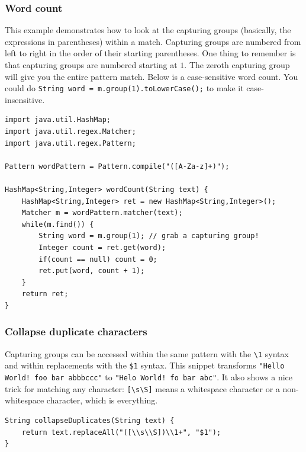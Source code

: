 \documentclass[a4paper,12pt]{article}
\begin{document}
\subsubsection{Word count}
This example demonstrates how to look at the capturing groups (basically, the expressions in parentheses) within a match. Capturing groups are numbered from left to right in the order of their starting parentheses. One thing to remember is that capturing groups are numbered starting at $1$. The zeroth capturing group will give you the entire pattern match. Below is a case-sensitive word count. You could do \verb/String word = m.group(1).toLowerCase();/ to make it case-insensitive.
\begin{lstlisting}
import java.util.HashMap;
import java.util.regex.Matcher;
import java.util.regex.Pattern;

Pattern wordPattern = Pattern.compile("([A-Za-z]+)");

HashMap<String,Integer> wordCount(String text) {
	HashMap<String,Integer> ret = new HashMap<String,Integer>();
	Matcher m = wordPattern.matcher(text);
	while(m.find()) {
		String word = m.group(1); // grab a capturing group!
		Integer count = ret.get(word);
		if(count == null) count = 0;
		ret.put(word, count + 1);
	}
	return ret;
}
\end{lstlisting}

\subsubsection{Collapse duplicate characters}
Capturing groups can be accessed within the same pattern with the \verb/\1/ syntax and within replacements with the \verb/$1/ syntax. This snippet transforms \verb/"Hello World! foo bar abbbccc"/ to \verb/"Helo World! fo bar abc"/. It also shows a nice trick for matching any character: \verb/[\s\S]/ means a whitespace character or a non-whitespace character, which is everything.
\begin{lstlisting}
String collapseDuplicates(String text) {
	return text.replaceAll("([\\s\\S])\\1+", "$1");
}
\end{lstlisting}
\end{document}
